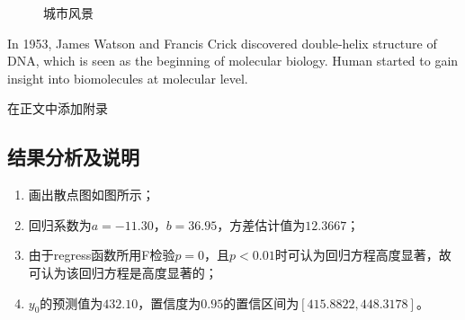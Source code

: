 \documentclass[UTF8,12pt,a4paper]{article}
\begin{document}
\begin{figure}[htbp]
	\quad
	\caption{城市风景}
\end{figure}


In 1953, James Watson and Francis Crick discovered double-helix structure of DNA, which is seen as the beginning of molecular biology. Human started to gain insight into biomolecules at molecular level.

\begin{appendices}
在正文中添加附录
\end{appendices}

\subsection{结果分析及说明}
\begin{enumerate}
	\item 画出散点图如图所示；
	\item 回归系数为$a=-11.30$，$b=36.95$，方差估计值为$12.3667$；
	\item 由于regress函数所用F检验$p=0$，且$p<0.01$时可认为回归方程高度显著，故可认为该回归方程是高度显著的；
	\item $y_0$的预测值为$432.10$，置信度为$0.95$的置信区间为$[415.8822,448.3178]$。
\end{enumerate}
\end{document}
